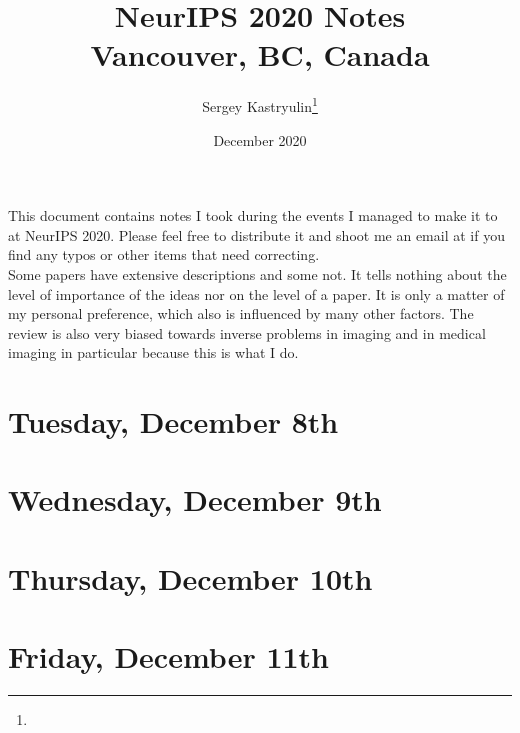 \documentclass[11pt]{article}
\title{NeurIPS 2020 Notes \\ \Large{Vancouver, BC, Canada}}
\author{Sergey Kastryulin\footnote{\durl{https://github.com/snk4tr}} \\ \durl{snk4tr@gmail.com}}
\date{December 2020}
\begin{document}
\maketitle
\tableofcontents
\newpage


This document contains notes I took during the events I managed to make it to at NeurIPS 2020. Please feel free to distribute it and shoot me an email at  if you find any typos or other items that need correcting. \\

Some papers have extensive descriptions and some not. 
It tells nothing about the level of importance of the ideas nor on the level of a paper. 
It is only a matter of my personal preference, which also is influenced by many other factors.
The review is also very biased towards inverse problems in imaging and in medical imaging in particular because this is what I do.



\newpage
\section{Tuesday, December 8th}


\newpage
\section{Wednesday, December 9th}


\newpage
\section{Thursday, December 10th}


\newpage
\section{Friday, December 11th}


\newpage
\end{document}
